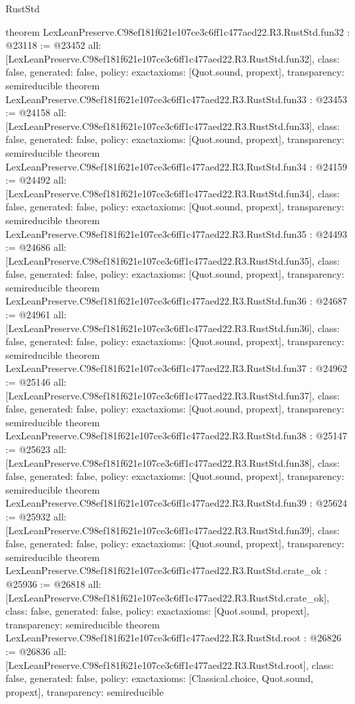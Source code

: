 \begin{lexlean}{RustStd}
\begin{coremodule}
{}
theorem LexLeanPreserve.C98ef181f621e107ce3c6ff1c477aed22.R3.RustStd.fun32 : @23118 := @23452 {
  all: [LexLeanPreserve.C98ef181f621e107ce3c6ff1c477aed22.R3.RustStd.fun32],
  class: false,
  generated: false,
  policy: exact{axioms: [Quot.sound, propext]},
  transparency: semireducible
}
theorem LexLeanPreserve.C98ef181f621e107ce3c6ff1c477aed22.R3.RustStd.fun33 : @23453 := @24158 {
  all: [LexLeanPreserve.C98ef181f621e107ce3c6ff1c477aed22.R3.RustStd.fun33],
  class: false,
  generated: false,
  policy: exact{axioms: [Quot.sound, propext]},
  transparency: semireducible
}
theorem LexLeanPreserve.C98ef181f621e107ce3c6ff1c477aed22.R3.RustStd.fun34 : @24159 := @24492 {
  all: [LexLeanPreserve.C98ef181f621e107ce3c6ff1c477aed22.R3.RustStd.fun34],
  class: false,
  generated: false,
  policy: exact{axioms: [Quot.sound, propext]},
  transparency: semireducible
}
theorem LexLeanPreserve.C98ef181f621e107ce3c6ff1c477aed22.R3.RustStd.fun35 : @24493 := @24686 {
  all: [LexLeanPreserve.C98ef181f621e107ce3c6ff1c477aed22.R3.RustStd.fun35],
  class: false,
  generated: false,
  policy: exact{axioms: [Quot.sound, propext]},
  transparency: semireducible
}
theorem LexLeanPreserve.C98ef181f621e107ce3c6ff1c477aed22.R3.RustStd.fun36 : @24687 := @24961 {
  all: [LexLeanPreserve.C98ef181f621e107ce3c6ff1c477aed22.R3.RustStd.fun36],
  class: false,
  generated: false,
  policy: exact{axioms: [Quot.sound, propext]},
  transparency: semireducible
}
theorem LexLeanPreserve.C98ef181f621e107ce3c6ff1c477aed22.R3.RustStd.fun37 : @24962 := @25146 {
  all: [LexLeanPreserve.C98ef181f621e107ce3c6ff1c477aed22.R3.RustStd.fun37],
  class: false,
  generated: false,
  policy: exact{axioms: [Quot.sound, propext]},
  transparency: semireducible
}
theorem LexLeanPreserve.C98ef181f621e107ce3c6ff1c477aed22.R3.RustStd.fun38 : @25147 := @25623 {
  all: [LexLeanPreserve.C98ef181f621e107ce3c6ff1c477aed22.R3.RustStd.fun38],
  class: false,
  generated: false,
  policy: exact{axioms: [Quot.sound, propext]},
  transparency: semireducible
}
theorem LexLeanPreserve.C98ef181f621e107ce3c6ff1c477aed22.R3.RustStd.fun39 : @25624 := @25932 {
  all: [LexLeanPreserve.C98ef181f621e107ce3c6ff1c477aed22.R3.RustStd.fun39],
  class: false,
  generated: false,
  policy: exact{axioms: [Quot.sound, propext]},
  transparency: semireducible
}
theorem LexLeanPreserve.C98ef181f621e107ce3c6ff1c477aed22.R3.RustStd.crate_ok : @25936 := @26818 {
  all: [LexLeanPreserve.C98ef181f621e107ce3c6ff1c477aed22.R3.RustStd.crate_ok],
  class: false,
  generated: false,
  policy: exact{axioms: [Quot.sound, propext]},
  transparency: semireducible
}
theorem LexLeanPreserve.C98ef181f621e107ce3c6ff1c477aed22.R3.RustStd.root : @26826 := @26836 {
  all: [LexLeanPreserve.C98ef181f621e107ce3c6ff1c477aed22.R3.RustStd.root],
  class: false,
  generated: false,
  policy: exact{axioms: [Classical.choice, Quot.sound, propext]},
  transparency: semireducible
}


\end{coremodule}
\end{lexlean}
